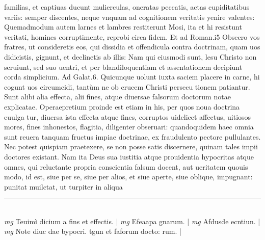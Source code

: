 \documentclass{article}
\begin{document}
\begin{pages}
familias, et captiuas ducunt mulierculas, oneratas peccatis, actas cupiditatibus variis: semper discentes, neque    vnquam ad cognitionem veritatis yenire valentes: Quemadmodum autem larnes et   lambres restiterunt Mosi, ita et hi resistunt veritati, homines corruptimente, reprobi   circa fidem. Et ad Roman.i5 Obsecro vos fratres, ut consideretis eos, qui dissidia et   offendicula contra doctrinam, quam uos didicistis, gignunt, et declinetis ab illis: Nam   qui eiusmodi sunt, lesu Christo non seruiunt, sed suo uentri, et per blandiloquentiam   et assentationem decipiunt corda simplicium. Ad Galat.6. Quicunque  uolunt iuxta saciem placere in carne, hi cogunt uos circumcidi, tantùm ne ob crucem Christi persecu   tionem patiantur. Sunt alibi alia effecta, alii fines, atque  diuersae falsorum doctorum notae explicatae. Operaepretium proinde est etiam in his, per quos noua doctrina euulga tur, diuersa ista effecta atque  fines, corruptos uidelicet affectus, uitiosos mores, fines inhonestos, flagitia, diligenter obseruari: quandoquidem haec omnia sunt reuera tanquam fructus impiae doctrinae, ex fraudulento pectore pullulantes. Nec potest quispiam praetexere, se non posse satis discernere, quinam tales impii doctores existant. Nam ita Deus sua iustitia atque  prouidentia hypocritas atque  omnes, qui reluctante propria conscientia falsum docent, aut ueritatem quouis modo, id est, siue per se, siue per alios, et siue aperte, siue oblique, impugnant: punitat muilctat, ut turpiter in aliqua  \pend
\vspace{0.5cm}\noindent
\vspace{0.2cm}\rule{1cm}{0.2pt}\\ 
\hspace{0.2cm}\textit{mg}
\footnotesize Teuimì dicium a fins et effectis. 
\normalsize| 
\hspace{0.2cm}\textit{mg}
\footnotesize Efeaapa gnarum. 
\normalsize| 
\hspace{0.2cm}\textit{mg}
\footnotesize Afdusde ecntiun. 
\normalsize| 
\hspace{0.2cm}\textit{mg}
\footnotesize Note diuc dae bypocri. tgun et faforum docto: rum. 
\normalsize| 

\end{pages}
\end{document}
